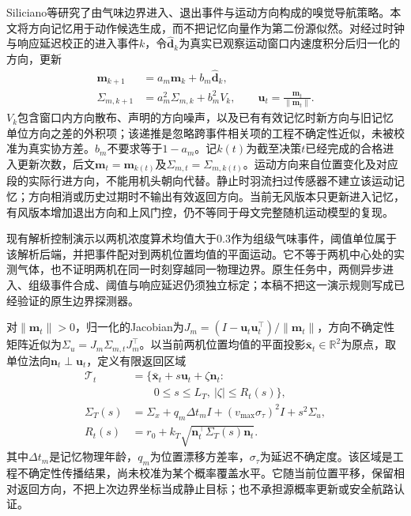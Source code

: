 Siliciano等研究了由气味边界进入、退出事件与运动方向构成的嗅觉导航策略。本文将方向记忆用于动作候选生成，而不把记忆向量作为第二份源似然。对经过时钟与响应延迟校正的进入事件$k$，令$\widehat{\mathbf d}_k$为真实已观察运动窗口内速度积分后归一化的方向，更新
\begin{equation}
\begin{aligned}
\mathbf m_{k+1}&=a_m\mathbf m_k+b_m\widehat{\mathbf d}_k,\\
\Sigma_{m,k+1}&=a_m^2\Sigma_{m,k}+b_m^2V_k,\qquad
\mathbf u_t=\frac{\mathbf m_t}{\|\mathbf m_t\|}.
\end{aligned}
\label{eq:m2_memory}
\end{equation}
$V_k$包含窗口内方向散布、声明的方向噪声，以及已有有效记忆时新方向与旧记忆单位方向之差的外积项；该递推是忽略跨事件相关项的工程不确定性近似，未被校准为真实协方差。$b_m$不要求等于$1-a_m$。记$k(t)$为截至决策$t$已经完成的合格进入更新次数，后文$\mathbf m_t=\mathbf m_{k(t)}$及$\Sigma_{m,t}=\Sigma_{m,k(t)}$。运动方向来自位置变化及对应段的实际行进方向，不能用机头朝向代替。静止时羽流扫过传感器不建立该运动记忆；方向相消或历史过期时不输出有效返回方向。当前无风版本只更新进入记忆，有风版本增加退出方向和上风门控，仍不等同于母文完整随机运动模型的复现。

现有解析控制演示以两机浓度算术均值大于0.3作为组级气味事件，阈值单位属于该解析后端，并把事件配对到两机位置均值的平面运动。它不等于两机中心处的实测气体，也不证明两机在同一时刻穿越同一物理边界。原生任务中，两侧异步进入、组级事件合成、阈值与响应延迟仍须独立标定；本稿不把这一演示规则写成已经验证的原生边界探测器。

对$\|\mathbf m_t\|>0$，归一化的Jacobian为$J_m=(I-\mathbf u_t\mathbf u_t^\top)/\|\mathbf m_t\|$，方向不确定性矩阵近似为$\Sigma_u=J_m\Sigma_{m,t}J_m^\top$。以当前两机位置均值的平面投影$\bar{\mathbf x}_t\in\mathbb R^2$为原点，取单位法向$\mathbf n_t\perp\mathbf u_t$，定义有限返回区域
\begin{equation}
\begin{aligned}
\mathcal T_t&=\{\bar{\mathbf x}_t+s\mathbf u_t+\zeta\mathbf n_t:\\
&\hspace{2em}0\le s\le L_T,\ |\zeta|\le R_t(s)\},\\
\Sigma_T(s)&=\Sigma_x+q_m\Delta t_m I+(v_{\max}\sigma_\tau)^2I+s^2\Sigma_u,\\
R_t(s)&=r_0+k_T\sqrt{\mathbf n_t^\top\Sigma_T(s)\mathbf n_t}.
\end{aligned}
\label{eq:m2_tube}
\end{equation}
其中$\Delta t_m$是记忆物理年龄，$q_m$为位置漂移方差率，$\sigma_\tau$为延迟不确定度。该区域是工程不确定性传播结果，尚未校准为某个概率覆盖水平。它随当前位置平移，保留相对返回方向，不把上次边界坐标当成静止目标；也不承担源概率更新或安全航路认证。

